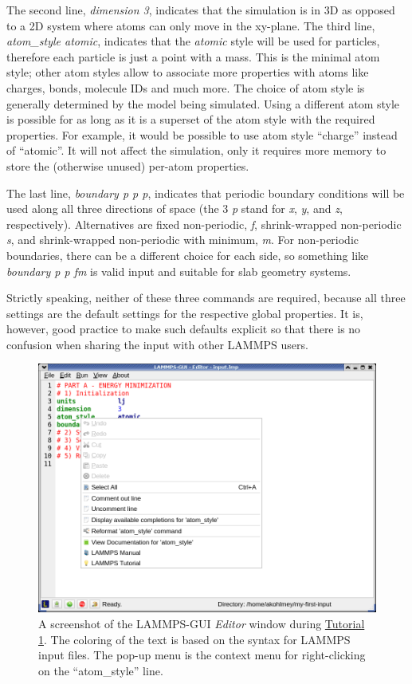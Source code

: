 \documentclass[9pt,tutorial]{livecoms}
\begin{document}
The second line, \textit{dimension 3}, indicates that the
simulation is in 3D as opposed to a 2D system where atoms can only
move in the xy-plane.  The third line, \textit{atom\_style atomic},
indicates that the \textit{atomic} style will be used for particles,
therefore each particle is just a point with a mass.  This is the
minimal atom style; other atom styles allow to associate more properties
with atoms like charges, bonds, molecule IDs and much more.  The
choice of atom style is generally determined by the model being
simulated.  Using a different atom style is possible for as long
as it is a superset of the atom style with the required properties.
For example, it would be possible to use atom style ``charge'' instead
of ``atomic''.  It will not affect the simulation, only it requires
more memory to store the (otherwise unused) per-atom properties.

The last line, \textit{boundary p p p}, indicates that periodic boundary
conditions will be used along all three directions of space (the 3
\textit{p} stand for \textit{x}, \textit{y}, and \textit{z},
respectively).  Alternatives are fixed non-periodic, \textit{f},
shrink-wrapped non-periodic \textit{s}, and shrink-wrapped non-periodic
with minimum, \textit{m}.  For non-periodic boundaries, there can be a
different choice for each side, so something like \textit{boundary p p
  fm} is valid input and suitable for slab geometry systems.

Strictly speaking, neither of these three commands are required, because
all three settings are the default settings for the respective global
properties.  It is, however, good practice to make such defaults
explicit so that there is no confusion when sharing the input with other
LAMMPS users.

\begin{figure}
\centering
\includegraphics[width=0.75\linewidth]{GUI-1.png}
\caption{A screenshot of the LAMMPS-GUI \textit{Editor} window during
  \hyperref[lennard-jones-label]{Tutorial 1}. The coloring of the text
  is based on the syntax for LAMMPS input files.  The pop-up menu is the
  context menu for right-clicking on the ``atom\_style'' line.}
\label{fig:GUI-1}
\end{figure}
\end{document}
